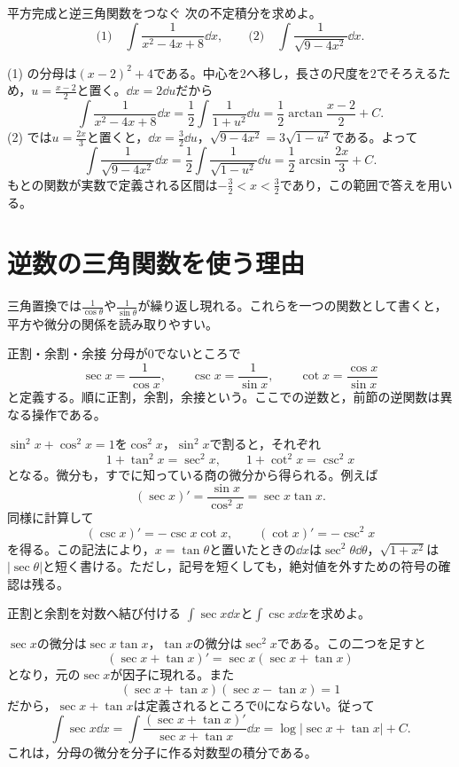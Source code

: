 \begin{example}{平方完成と逆三角関数をつなぐ}
次の不定積分を求めよ。
\[
\text{(1)}\quad\int\frac1{x^2-4x+8}\dd x,
\qquad
\text{(2)}\quad\int\frac1{\sqrt{9-4x^2}}\dd x.
\]
\end{example}

(1) の分母は$(x-2)^2+4$である。中心を$2$へ移し，長さの尺度を$2$でそろえるため，$u=\frac{x-2}{2}$と置く。$\dd x=2\dd u$だから
\[
\int\frac1{x^2-4x+8}\dd x
=\frac12\int\frac1{1+u^2}\dd u
=\frac12\arctan\frac{x-2}{2}+C.
\]
(2) では$u=\frac{2x}{3}$と置くと，$\dd x=\frac32\dd u$，$\sqrt{9-4x^2}=3\sqrt{1-u^2}$である。よって
\[
\int\frac1{\sqrt{9-4x^2}}\dd x
=\frac12\int\frac1{\sqrt{1-u^2}}\dd u
=\frac12\arcsin\frac{2x}{3}+C.
\]
もとの関数が実数で定義される区間は$-\frac32<x<\frac32$であり，この範囲で答えを用いる。

\section{逆数の三角関数を使う理由}\label{節:相反三角関数}

三角置換では$\frac1{\cos\theta}$や$\frac1{\sin\theta}$が繰り返し現れる。これらを一つの関数として書くと，平方や微分の関係を読み取りやすい。
\begin{definition}{正割・余割・余接}
分母が$0$でないところで
\[
\sec x=\frac1{\cos x},\qquad
\csc x=\frac1{\sin x},\qquad
\cot x=\frac{\cos x}{\sin x}
\]
と定義する。順に正割，余割，余接という。ここでの逆数と，前節の逆関数は異なる操作である。
\end{definition}

$\sin^2x+\cos^2x=1$を$\cos^2x$，$\sin^2x$で割ると，それぞれ
\[
1+\tan^2x=\sec^2x,\qquad
1+\cot^2x=\csc^2x
\]
となる。微分も，すでに知っている商の微分から得られる。例えば
\[
(\sec x)'=\frac{\sin x}{\cos^2x}=\sec x\tan x.
\]
同様に計算して
\begin{equation}\label{式:相反三角関数の微分}
(\csc x)'=-\csc x\cot x,\qquad
(\cot x)'=-\csc^2x
\end{equation}
を得る。この記法により，$x=\tan\theta$と置いたときの$\dd x$は$\sec^2\theta\dd\theta$，$\sqrt{1+x^2}$は$|\sec\theta|$と短く書ける。ただし，記号を短くしても，絶対値を外すための符号の確認は残る。

\begin{example}{正割と余割を対数へ結び付ける}
$\int\sec x\dd x$と$\int\csc x\dd x$を求めよ。
\end{example}

$\sec x$の微分は$\sec x\tan x$，$\tan x$の微分は$\sec^2x$である。この二つを足すと
\[
(\sec x+\tan x)'=\sec x(\sec x+\tan x)
\]
となり，元の$\sec x$が因子に現れる。また
\[
(\sec x+\tan x)(\sec x-\tan x)=1
\]
だから，$\sec x+\tan x$は定義されるところで$0$にならない。従って
\[
\int\sec x\dd x
=\int\frac{(\sec x+\tan x)'}{\sec x+\tan x}\dd x
=\log|\sec x+\tan x|+C.
\]
これは，分母の微分を分子に作る対数型の積分である。

